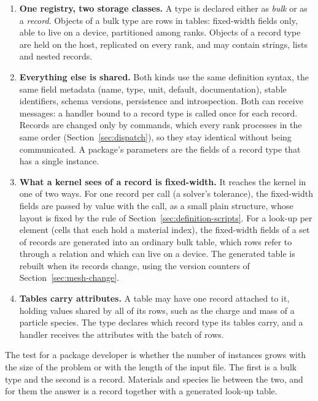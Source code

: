 \documentclass[11pt,a4paper]{article}
\begin{document}
\begin{enumerate}
  \item \textbf{One registry, two storage classes.}  A type is declared
        either as \emph{bulk} or as a \emph{record}.  Objects of a bulk type
        are rows in tables: fixed-width fields only, able to live on a
        device, partitioned among ranks.  Objects of a record type are held
        on the host, replicated on every rank, and may contain strings,
        lists and nested records.
  \item \textbf{Everything else is shared.}  Both kinds use the same
        definition syntax, the same field metadata (name, type, unit,
        default, documentation), stable identifiers, schema versions,
        persistence and introspection.  Both can receive messages: a handler
        bound to a record type is called once for each record.  Records are
        changed only by commands, which every rank processes in the same
        order (Section~\ref{sec:dispatch}), so they stay identical without
        being communicated.  A package's parameters are the fields of a
        record type that has a single instance.
  \item \textbf{What a kernel sees of a record is fixed-width.}  It reaches
        the kernel in one of two ways.  For one record per call (a solver's
        tolerance), the fixed-width fields are passed by value with the
        call, as a small plain structure, whose layout is fixed by the rule
        of Section~\ref{sec:definition-scripts}.  For a look-up per element (cells
        that each hold a material index), the fixed-width fields of a set of
        records are generated into an ordinary bulk table, which rows refer
        to through a relation and which can live on a device.  The generated
        table is rebuilt when its records change, using the version counters
        of Section~\ref{sec:mesh-change}.
  \item \textbf{Tables carry attributes.}  A table may have one record
        attached to it, holding values shared by all of its rows, such as
        the charge and mass of a particle species.  The type declares which
        record type its tables carry, and a handler receives the attributes
        with the batch of rows.
\end{enumerate}

The test for a package developer is whether the number of instances grows
with the size of the problem or with the length of the input file.  The
first is a bulk type and the second is a record.  Materials and species lie
between the two, and for them the answer is a record together with a
generated look-up table.
\end{document}
